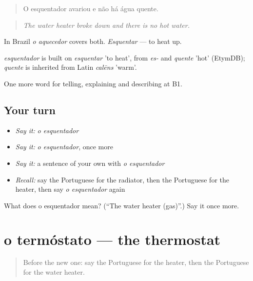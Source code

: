 \begin{quote}
O esquentador avariou e não há água quente.
\end{quote}

\begin{quote}
\emph{The water heater broke down and there is no hot water.}
\end{quote}

In Brazil \emph{o aquecedor} covers both. \emph{Esquentar} — to heat up.

\begin{cousinweb}
\emph{esquentador} is built on \emph{esquentar} 'to heat', from \emph{es-} and \emph{quente} 'hot' (EtymDB); \emph{quente} is inherited from Latin \emph{calēns} 'warm'.
\end{cousinweb}

\begin{grammarlens}[title={What you've built}]
One more word for telling, explaining and describing at B1.
\end{grammarlens}

\subsection*{Your turn}
\begin{itemize}
\raggedright
  \item \emph{Say it:} \emph{o esquentador}
  \item \emph{Say it:} \emph{o esquentador}, once more
  \item \emph{Say it:} a sentence of your own with \emph{o esquentador}
  \item \emph{Recall:} say the Portuguese for the radiator, then the Portuguese for the heater, then say \emph{o esquentador} again
\end{itemize}

\begin{tcolorbox}[breakable,colback=teal!4,colframe=teal!35!black,title={Before you move on}]
What does o esquentador mean? (\textquotedblleft{}The water heater (gas)\textquotedblright{}.) Say it once more.
\end{tcolorbox}
\section[o termóstato]{o termóstato — the thermostat}

\label{lesson:PT-C431-termostato}



\begin{quote}
Before the new one: say the Portuguese for the heater, then the Portuguese for the water heater.
\end{quote}

